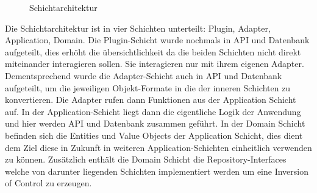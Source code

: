 \begin{figure}[htbp]
    \centering
    \caption{\label{flutter-1} Schichtarchitektur}
\end{figure}

Die Schichtarchitektur ist in vier Schichten unterteilt: Plugin, Adapter, Application, Domain.
Die Plugin-Schicht wurde nochmals in API und Datenbank aufgeteilt,
dies erhöht die übersichtlichkeit da die beiden Schichten nicht direkt miteinander interagieren sollen.
Sie interagieren nur mit ihrem eigenen Adapter.
Dementsprechend wurde die Adapter-Schicht auch in API und Datenbank aufgeteilt, um die jeweiligen Objekt-Formate in die der inneren Schichten zu konvertieren.
Die Adapter rufen dann Funktionen aus der Application Schicht auf.
In der Application-Schicht liegt dann die eigentliche Logik der Anwendung und hier werden API und Datenbank zusammen geführt.
In der Domain Schicht befinden sich die Entities und Value Objects der Application Schicht,
dies dient dem Ziel diese in Zukunft in weiteren Application-Schichten einheitlich verwenden zu können.
Zusätzlich enthält die Domain Schicht die Repository-Interfaces welche von darunter liegenden Schichten implementiert werden um eine Inversion of Control zu erzeugen.